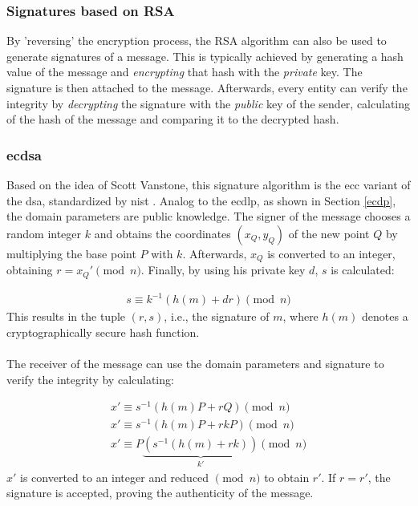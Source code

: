 \subsubsection{Signatures based on RSA}

By 'reversing' the encryption process, the RSA algorithm can also be used to generate signatures of a message.
This is typically achieved by generating a hash value of the message and \textit{encrypting} that hash with the \textit{private} key. The signature is then attached to the
message. Afterwards, every entity can verify the integrity by \textit{decrypting} the signature with the \textit{public} key of the sender, calculating of
the hash of the message and comparing it to the decrypted hash.

\subsubsection{\gls{ecdsa}}

Based on the idea of Scott Vanstone, this signature algorithm is the \gls{ecc} variant of the \gls{dsa}, standardized by \gls{nist} \cite{nistECDSA}.
Analog to the \gls{ecdlp}, as shown in Section \ref{ecdp}, the domain parameters are public knowledge. The signer of the message chooses a random integer $k$ and
obtains the coordinates $(x_Q, y_Q)$ of the new point $Q$ by multiplying the base point $P$ with $k$.
Afterwards, $x_Q$ is converted to an integer, obtaining $r = x_Q' \pmod n$. Finally, by using his private key $d$, $s$ is calculated:

\begin{align}\label{ecdsLabel}
s \equiv k^{-1}(h(m)+dr) \pmod n
\end{align}
This results in the tuple $(r,s)$, i.e., the signature of $m$, where $h(m)$ denotes a cryptographically secure hash function. 
\\
\\
The receiver of the message can use the domain parameters and signature to verify the integrity by calculating:

\begin{align*}
 x' \equiv s^{-1}(h(m)P + rQ) \pmod n\\
 x' \equiv s^{-1}(h(m)P + rkP) \pmod n\\
 x' \equiv P \underbrace{(s^{-1}(h(m) + rk))}_{k'} \pmod n
\end{align*}
$x'$ is converted to an integer and reduced $\pmod n$ to obtain $r'$. If $r = r'$, the signature is accepted, proving the authenticity of the message.

